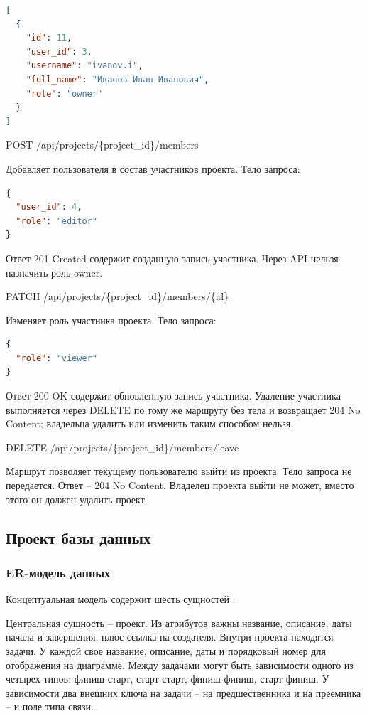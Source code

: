 \begin{lstlisting}[numbers=none, language=json]
[
  {
    "id": 11,
    "user_id": 3,
    "username": "ivanov.i",
    "full_name": "Иванов Иван Иванович",
    "role": "owner"
  }
]
\end{lstlisting}


POST /api/projects/\{project\_id\}/members

Добавляет пользователя в состав участников проекта. Тело запроса:

\begin{lstlisting}[numbers=none, language=json]
{
  "user_id": 4,
  "role": "editor"
}
\end{lstlisting}


Ответ 201 Created содержит созданную запись участника. Через API нельзя назначить роль owner.

PATCH /api/projects/\{project\_id\}/members/\{id\}

Изменяет роль участника проекта. Тело запроса:

\begin{lstlisting}[numbers=none, language=json]
{
  "role": "viewer"
}
\end{lstlisting}


Ответ 200 OK содержит обновленную запись участника. Удаление участника выполняется через DELETE по тому же маршруту без тела и возвращает 204 No Content; владельца удалить или изменить таким способом нельзя.

DELETE /api/projects/\{project\_id\}/members/leave

Маршрут позволяет текущему пользователю выйти из проекта. Тело запроса не передается. Ответ -- 204 No Content. Владелец проекта выйти не может, вместо этого он должен удалить проект.

\subsection{Проект базы данных}

\subsubsection{ER-модель данных}

Концептуальная модель содержит шесть сущностей \cite{date_db, art_db_methodology}.

Центральная сущность -- проект. Из атрибутов важны название, описание, даты начала и завершения, плюс ссылка на создателя. Внутри проекта находятся задачи. У каждой свое название, описание, даты и порядковый номер для отображения на диаграмме. Между задачами могут быть зависимости одного из четырех типов: финиш-старт, старт-старт, финиш-финиш, старт-финиш. У зависимости два внешних ключа на задачи -- на предшественника и на преемника -- и поле типа связи.

